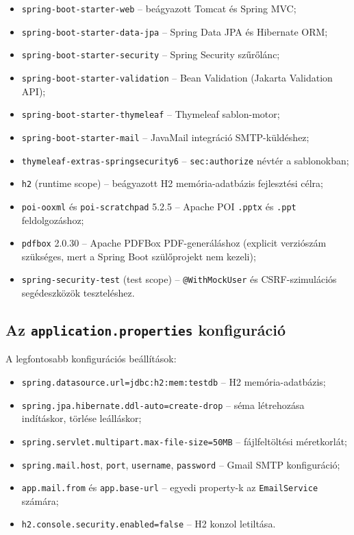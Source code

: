 \begin{itemize}
    \item \texttt{spring-boot-starter-web} – beágyazott Tomcat és Spring MVC;
    \item \texttt{spring-boot-starter-data-jpa} – Spring Data JPA és Hibernate ORM;
    \item \texttt{spring-boot-starter-security} – Spring Security szűrőlánc;
    \item \texttt{spring-boot-starter-validation} – Bean Validation (Jakarta Validation API);
    \item \texttt{spring-boot-starter-thymeleaf} – Thymeleaf sablon-motor;
    \item \texttt{spring-boot-starter-mail} – JavaMail integráció SMTP-küldéshez;
    \item \texttt{thymeleaf-extras-springsecurity6} – \texttt{sec:authorize} névtér a sablonokban;
    \item \texttt{h2} (runtime scope) – beágyazott H2 memória-adatbázis fejlesztési célra;
    \item \texttt{poi-ooxml} és \texttt{poi-scratchpad} 5.2.5 – Apache POI \texttt{.pptx} és \texttt{.ppt} feldolgozáshoz;
    \item \texttt{pdfbox} 2.0.30 – Apache PDFBox PDF-generáláshoz (explicit verziószám szükséges, mert a Spring Boot szülőprojekt nem kezeli);
    \item \texttt{spring-security-test} (test scope) – \texttt{@WithMockUser} és CSRF-szimulációs segédeszközök teszteléshez.
\end{itemize}

\subsection{Az \texttt{application.properties} konfiguráció}

A legfontosabb konfigurációs beállítások:

\begin{itemize}
    \item \texttt{spring.datasource.url=jdbc:h2:mem:testdb} – H2 memória-adatbázis;
    \item \texttt{spring.jpa.hibernate.ddl-auto=create-drop} – séma létrehozása indításkor, törlése leálláskor;
    \item \texttt{spring.servlet.multipart.max-file-size=50MB} – fájlfeltöltési méretkorlát;
    \item \texttt{spring.mail.host}, \texttt{port}, \texttt{username}, \texttt{password} – Gmail SMTP konfiguráció;
    \item \texttt{app.mail.from} és \texttt{app.base-url} – egyedi property-k az \texttt{EmailService} számára;
    \item \texttt{h2.console.security.enabled=false} – H2 konzol letiltása.
\end{itemize}

